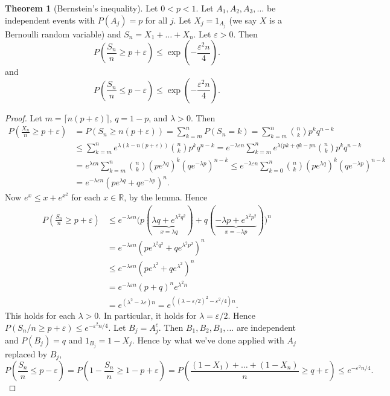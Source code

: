 \documentclass{article}
\newcommand{\R}{\mathbb{R}}
\theoremstyle{definition}
\newtheorem{theorem}{Theorem}
\begin{document}
\begin{theorem}[Bernstein's inequality]
Let $0 < p < 1$. Let $A_1, A_2, A_3, \dots$ be independent events with $P(A_j) = p$ for all $j$. Let $X_j = 1_{A_j}$ (we say $X$ is a Bernoulli random variable) and $S_n = X_1 + \dots + X_n$. Let $\varepsilon > 0$. Then
\[
    P\left(\frac{S_n}{n} \geq p+\varepsilon\right) \leq \exp\left(-\frac{\varepsilon^2n}{4}\right).
\]
and
\[
    P\left(\frac{S_n}{n} \leq p-\varepsilon\right) \leq \exp\left(-\frac{\varepsilon^2n}{4}\right).
\]
\end{theorem}
\begin{proof}
    Let $m = \lceil n(p+\varepsilon) \rceil$, $q = 1-p$, and $\lambda > 0$. Then
    \begin{align*}
        P\left(\frac{X_n}{n} \geq p + \varepsilon\right) &= P(S_n \geq n(p+\varepsilon))
            = \sum_{k=m}^n P(S_n = k) = \sum_{k=m}^n \binom{n}{k} p^k q^{n-k} \\
            &\leq \sum_{k=m}^n e^{\lambda(k-n(p+\varepsilon))} \binom{n}{k} p^k q^{n-k} = e^{-\lambda\varepsilon n}\sum_{k=m}^n e^{\lambda(pk+qk-pn} \binom{n}{k} p^k q^{n-k} \\
            &= e^{\lambda\epsilon n} \sum_{k=m}^n \binom{n}{k}(pe^{\lambda q})^k(qe^{-\lambda p})^{n-k} \leq e^{-\lambda\varepsilon n} \sum_{k=0}^n \binom{n}{k}(pe^{\lambda q})^k(qe^{-\lambda p})^{n-k} \\
            &= e^{-\lambda\varepsilon n} (pe^{\lambda q} + qe^{-\lambda p})^n.
    \end{align*}
    Now $e^x \leq x+e^{x^2}$ for each $x \in \R$, by the lemma. Hence
    \begin{align*}
        P\left(\frac{S_n}{n} \geq p + \varepsilon\right)
            &\leq e^{-\lambda\varepsilon n}\Big(p(\underbrace{\lambda q + e^{\lambda^2 q^2}}_{x = \lambda q}) + q(\underbrace{-\lambda p + e^{\lambda^2 p^2}}_{x = -\lambda p})\Big)^n \\
            &= e^{-\lambda\varepsilon n}(pe^{\lambda^2 q^2} + q e^{\lambda^2 p^2})^n \\
            &\leq e^{-\lambda\varepsilon n}(pe^{\lambda^2} + qe^{\lambda^2})^n \\
            &= e^{-\lambda\varepsilon n}(p+q)^n e^{\lambda^2 n} \\
            &= e^{(\lambda^2 - \lambda\varepsilon)n} = e^{((\lambda - \varepsilon/2)^2 - \varepsilon^2/4)n}.
    \end{align*}
    This holds for each $\lambda > 0$. In particular, it holds for $\lambda = \varepsilon/2$. Hence $P(S_n/n \geq p + \varepsilon) \leq e^{-\varepsilon^2n/4}$. Let $B_j = A_j^c$. Then $B_1, B_2, B_3, \dots$ are independent and $P(B_j) = q$ and $1_{B_j} = 1-X_j$. Hence by what we've done applied with $A_j$ replaced by $B_j$,
    \[
        P\left(\frac{S_n}{n} \leq p - \varepsilon\right) = P\left(1 - \frac{S_n}{n} \geq 1 - p + \varepsilon\right) = P\left(\frac{(1-X_1)+\dots+(1-X_n)}{n} \geq q+\varepsilon\right) \leq e^{-\varepsilon^2n/4}.
    \]
\end{proof}
\end{document}
